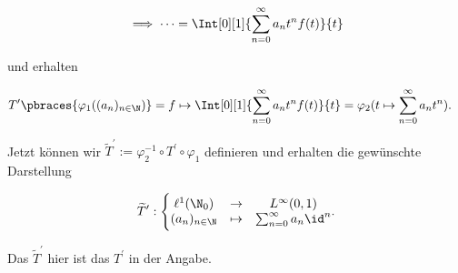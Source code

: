 \begin{solution}
\begin{align*}
  \implies
  \cdots
  =
  \Int[0][1]{\sum_{n=0}^\infty a_n t^n f(t)}{t}
\end{align*}

und erhalten

\begin{align*}
  T^\prime \pbraces
  {
    \varphi_1((a_n)_{n \in \N})
  }
  & =
  f
  \mapsto
  \Int[0][1]{\sum_{n=0}^\infty a_n t^n f(t)}{t}
  =
  \varphi_2(t \mapsto \sum_{n=0}^\infty a_n t^n).
\end{align*}

Jetzt können wir $\widetilde{T}^\prime := \varphi_2^{-1} \circ T^\prime \circ \varphi_1$ definieren und erhalten die gewünschte Darstellung

\begin{align*}
  \widetilde{T}^{\prime}:
  \Bigg \{
  \begin{matrix}
    \ell^1(\N_0) &
    \to          &
    L^\infty(0, 1) \\
    (a_n)_{n \in \N} &
    \mapsto          &
    \sum_{n=0}^\infty a_n \id^n
  \end{matrix}.
\end{align*}

Das $\widetilde{T}^\prime$ hier ist das $T^\prime$ in der Angabe.

\end{solution}
